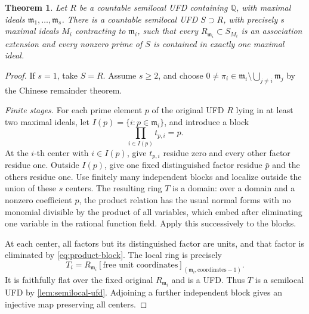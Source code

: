 \documentclass[11pt,reqno]{amsart}
\numberwithin{equation}{section}
\theoremstyle{plain}
\newtheorem{theorem}{Theorem}[section]
\theoremstyle{definition}
\theoremstyle{remark}
\begin{document}
\begin{theorem}\label{thm:separation}
Let \(R\) be a countable semilocal UFD containing \(\mathbb Q\),
with maximal ideals \(\mathfrak m_1,\ldots,\mathfrak m_s\).
There is a countable semilocal UFD \(S\supset R\), with precisely
\(s\) maximal ideals \(M_i\) contracting to \(\mathfrak m_i\),
such that every \(R_{\mathfrak m_i}\subset S_{M_i}\) is an
association extension and every nonzero prime of \(S\) is
contained in exactly one maximal ideal.
\end{theorem}
\begin{proof}
If \(s=1\), take \(S=R\). Assume \(s\ge2\), and choose
\(0\ne\pi_i\in\mathfrak m_i\setminus\bigcup_{j\ne i}
\mathfrak m_j\) by the Chinese remainder theorem.

\emph{Finite stages.}
For each prime element \(p\) of the original UFD \(R\) lying
in at least two maximal ideals, let
\(I(p)=\{i:p\in\mathfrak m_i\}\), and introduce a block
\begin{equation}\label{eq:product-block}
 \prod_{i\in I(p)}t_{p,i}=p.
\end{equation}
At the \(i\)-th center with \(i\in I(p)\), give \(t_{p,i}\)
residue zero and every other factor residue one. Outside
\(I(p)\), give one fixed distinguished factor residue \(\bar p\)
and the others residue one. Use finitely many independent
blocks and localize outside the union of these \(s\) centers.
The resulting ring \(T\) is a domain: over a domain and a
nonzero coefficient \(p\), the product relation has the usual
normal forms with no monomial divisible by the product of all
variables, which embed after eliminating one variable in the
rational function field. Apply this successively to the blocks.

At each center, all factors but its distinguished factor are
units, and that factor is eliminated by \eqref{eq:product-block}.
The local ring is precisely
\begin{equation}\label{eq:flat-chart}
 T_i=R_{\mathfrak m_i}[\text{free unit coordinates}]
 _{(\mathfrak m_i,\text{coordinates}-1)}.
\end{equation}
It is faithfully flat over the fixed original \(R_{\mathfrak m_i}\)
and is a UFD. Thus \(T\) is a semilocal UFD by
\cref{lem:semilocal-ufd}. Adjoining a further independent block
gives an injective map preserving all centers.


\end{proof}
\end{document}
